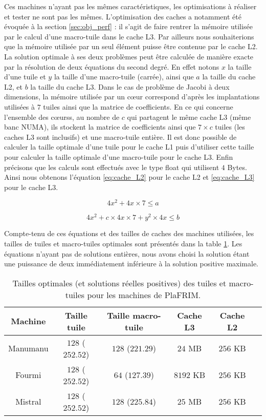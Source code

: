 Ces machines n'ayant pas les mêmes caractéristiques, les optimisations à réaliser et tester ne sont pas les mêmes. L'optimisation des caches a notamment été évoquée à la section \ref{sec:obj_perf} : il s'agit de faire rentrer la mémoire utilisée par le calcul d'une macro-tuile dans le cache L3. Par ailleurs nous souhaiterions que la mémoire utilisée par un seul élément puisse être contenue par le cache L2. La solution optimale à ses deux problèmes peut être calculée de manière exacte par la résolution de deux équations du second degré. En effet notons $x$ la taille d'une tuile et $y$ la taille d'une macro-tuile (carrée), ainsi que $a$ la taille du cache L2, et $b$ la taille du cache L3. Dans le cas de problème de Jacobi à deux dimensions, la mémoire utilisée par un cœur correspond d'après les implantations utilisées à $7$ tuiles ainsi que la matrice de coefficients. En ce qui concerne l'ensemble des cœurss, au nombre de $c$ qui partagent le même cache L3 (même banc NUMA), ils stockent la matrice de coefficients ainsi que $7 \times c$ tuiles (les caches L3 sont inclusifs) et une macro-tuile entière. Il est donc possible de calculer la taille optimale d'une tuile pour le cache L1 puis d'utiliser cette taille pour calculer la taille optimale d'une macro-tuile pour le cache L3. Enfin précisons que les calculs sont effectués avec le type \textsf{float} qui utilisent $4$ Bytes. Ainsi nous obtenons l'équation \ref{eq:cache_L2} pour le cache L2 et \ref{eq:cache_L3} pour le cache L3.

\begin{equation}
\label{eq:cache_L2}
4x^2 + 4x \times 7 \leq a
\end{equation}

\begin{equation}
\label{eq:cache_L3}
4x^2 + c \times 4x \times 7 + y^2 \times 4x \leq b
\end{equation}

Compte-tenu de ces équations et des tailles de caches des machines utilisées, les tailles de tuiles et macro-tuiles optimales sont présentés dans la table \ref{tab:size_cach}. Les équations n'ayant pas de solutions entières, nous avons choisi la solution étant une puissance de deux immédiatement inférieure à la solution positive maximale.

\begin{table}
{
\caption{Tailles optimales (et solutions réelles positives) des tuiles et macro-tuiles pour les machines de \textsf{PlaFRIM}.}
\label{tab:size_cach}
}
{
\begin{tabular}{||c||c|c|c|c|c||}
\hline
Machine & Taille tuile & Taille macro-tuile & Cache L3 & Cache L2 \\
\hline
\hline
Manumanu & $128$ ($252.52$) & $128$ ($221.29$) & $24$ MB & $256$ KB \\
Fourmi & $128$ ($252.52$) & $64$ ($127.39$) & $8192$ KB & $256$ KB \\
Mistral & $128$ ($252.52$) & $128$ ($225.84$) & $25$ MB & $256$ KB \\
\hline
\end{tabular}
}
\end{table} 


